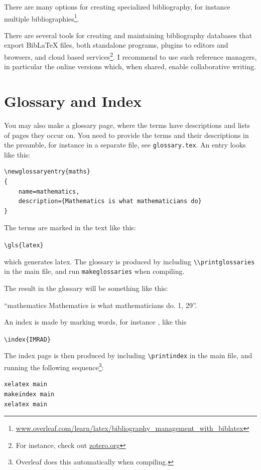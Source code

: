 There are many options for creating specialized bibliography, for instance multiple bibliographies\footnote{\url{www.overleaf.com/learn/latex/bibliography_management_with_biblatex}}.

There are several tools for creating and maintaining bibliography databases that export BibLaTeX files, both standalone programs, plugins to editors and browsers, and cloud based services\footnote{For instance, check out \url{zotero.org}}. I recommend to use such reference managers, in particular the online versions which, when shared, enable collaborative writing.

\section{Glossary and Index}

You may also make a glossary page, where the terms have descriptions and lists of pages they occur on. You need to provide the terms and their descriptions in the preamble, for instance in a separate file, see \verb|glossary.tex|. An entry looks like this:

\begin{lstlisting}[float,float=!htbp]
\newglossaryentry{maths}
{
    name=mathematics,
    description={Mathematics is what mathematicians do}
}
\end{lstlisting}

The terms are marked in the text like this:

\verb|\gls{latex}|

which generates
\gls{latex}. The glossary is produced by including \verb|\\printglossaries| in the main file, and run \verb|makeglossaries| when compiling. 

The result in the glossary will be something like this:  

``mathematics Mathematics is what mathematicians do. 1, 29''.

An index is made by marking words, for instance , like this

\verb|\index{IMRAD}|

The index page is then produced by including \verb|\printindex| in the main file, and running the following sequence\footnote{Overleaf does this automatically when compiling.}:

\begin{lstlisting}[float,float=!htbp]
xelatex main
makeindex main
xelatex main
\end{lstlisting}

